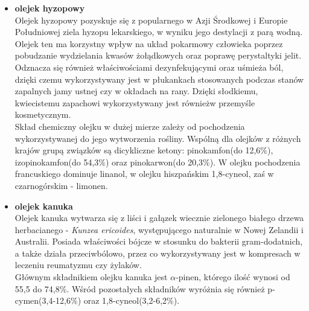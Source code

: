 \documentclass[11pt,a4paper]{report}
\begin{document}
\begin{itemize}
\item \textbf{olejek hyzopowy}\\
Olejek hyzopowy pozyskuje się z popularnego w Azji Środkowej i Europie Południowej ziela hyzopu lekarskiego, w wyniku jego destylacji z parą wodną. Olejek ten ma korzystny wpływ na układ pokarmowy człowieka poprzez pobudzanie wydzielania kwasów żołądkowych oraz poprawę perystaltyki jelit. Odznacza się również  właściwościami dezynfekującymi oraz uśmieża ból, dzięki czemu wykorzystywany jest w płukankach stosowanych podczas stanów zapalnych jamy ustnej czy w okładach na rany. Dzięki słodkiemu, kwiecistemu  zapachowi wykorzystywany jest równieżw przemyśle kosmetycznym\cite{gorailis, ruminska}.\\
Skład chemiczny olejku w dużej mierze zależy od pochodzenia wykorzystywanej do jego wytworzenia rośliny. Wspólną dla olejków z różnych krajów grupą związków są dicykliczne ketony: pinokamfon(do 12,6$\%$), izopinokamfon(do 54,3$\%$) oraz pinokarwon(do 20,3$\%$). W olejku pochodzenia francuskiego dominuje linanol, w olejku hiszpańskim 1,8-cyneol, zaś w czarnogórskim - limonen\cite{gorailis}.


\item \textbf{olejek kanuka}\\
Olejek kanuka wytwarza się z liści i gałązek wiecznie zielonego białego drzewa herbacianego - \textit{Kunzea ericoides}, występującego naturalnie w Nowej Zelandii i Australii\cite{lis}. Posiada właściwości bójcze w stosunku do bakterii gram-dodatnich, a także działa przeciwbólowo, przez co wykorzystywany jest w kompresach w leczeniu reumatyzmu czy żylaków\cite{pollena_k, brud2001}.\\
Głównym składnikiem olejku kanuka jest $\alpha$-pinen, którego ilość wynosi od 55,5 do 74,8$\%$. Wśród pozostałych składników wyróżnia się również p-cymen(3,4-12,6$\%$) oraz 1,8-cyneol(3,2-6,2$\%$)\cite{manukaikanuka, lis}.



\end{itemize}
\end{document}
